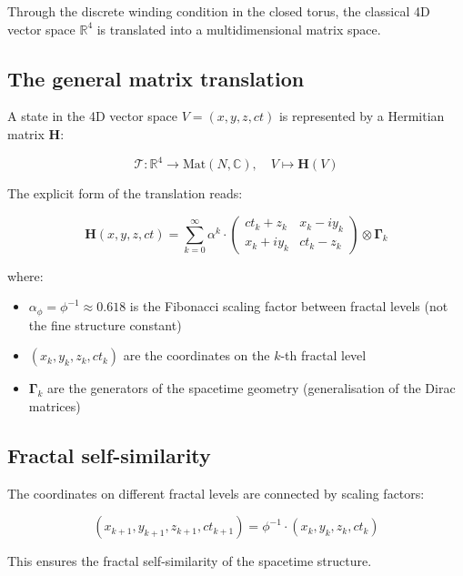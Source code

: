 	Through the discrete winding condition in the closed torus, the classical 4D vector space $\mathbb{R}^4$ is translated into a multidimensional matrix space.
	
	\subsection{The general matrix translation}
	
	A state in the 4D vector space $V = (x, y, z, ct)$ is represented by a Hermitian matrix $\mathbf{H}$:
	
	\begin{equation}
		\mathcal{T}: \mathbb{R}^4 \rightarrow \text{Mat}(N, \mathbb{C}), \quad V \mapsto \mathbf{H}(V)
	\end{equation}
	
	The explicit form of the translation reads:
	
	\begin{equation}
		\mathbf{H}(x,y,z,ct) = \sum_{k=0}^{\infty} \alpha^k \cdot 
		\begin{pmatrix}
			ct_k + z_k & x_k - iy_k \\
			x_k + iy_k & ct_k - z_k
		\end{pmatrix} \otimes \mathbf{\Gamma}_k
	\end{equation}
	
	where:
	\begin{itemize}
		\item $\alpha_\phi = \phi^{-1} \approx 0.618$ is the Fibonacci scaling factor between fractal levels (not the fine structure constant)
		\item $(x_k, y_k, z_k, ct_k)$ are the coordinates on the $k$-th fractal level
		\item $\mathbf{\Gamma}_k$ are the generators of the spacetime geometry (generalisation of the Dirac matrices)
	\end{itemize}
	
	\subsection{Fractal self-similarity}
	
	The coordinates on different fractal levels are connected by scaling factors:
	
	\begin{equation}
		(x_{k+1}, y_{k+1}, z_{k+1}, ct_{k+1}) = \phi^{-1} \cdot (x_k, y_k, z_k, ct_k)
	\end{equation}
	
	This ensures the fractal self-similarity of the spacetime structure.
	
